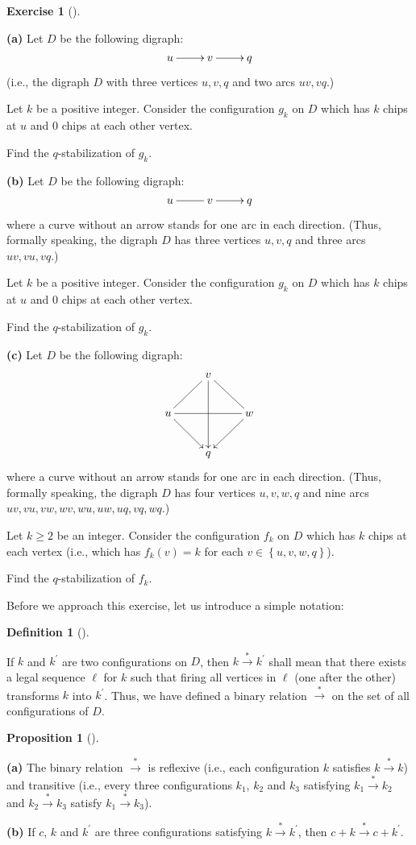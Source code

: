\documentclass[numbers=enddot,12pt,final,onecolumn,notitlepage]{scrartcl}%
\makeatletter
\newcounter{exer}
\theoremstyle{definition}
\newtheorem{prop}[theo]{Proposition}
\newenvironment{proposition}[1][]
{\begin{prop}[#1]\begin{leftbar}}
{\end{leftbar}\end{prop}}
\newtheorem{defi}[theo]{Definition}
\newenvironment{definition}[1][]
{\begin{defi}[#1]\begin{leftbar}}
{\end{leftbar}\end{defi}}
\newtheorem{exmp}[exer]{Exercise}
\newenvironment{exercise}[1][]
{\begin{exmp}[#1]\begin{leftbar}}
{\end{leftbar}\end{exmp}}
\newcommand{\set}[1]{\left\{ #1 \right\}}
\newcommand{\tup}[1]{\left( #1 \right)}
\newcommand{\are}{\ar@{-}}
\makeatother
\begin{document}
\Needspace{15cm}
\begin{exercise} \label{exe.chip.examples}
\textbf{(a)} Let $D$ be the following digraph:
\[
\xymatrix{
 u \ar[r] & v \ar[r] & q
}
\]
(i.e., the digraph $D$ with three vertices
$u, v, q$ and two arcs $uv, vq$.)

Let $k$ be a positive integer.
Consider the configuration $g_k$ on $D$ which has $k$ chips at $u$
and $0$ chips at each other vertex.

Find the $q$-stabilization of $g_k$.

\textbf{(b)} Let $D$ be the following digraph:
\[
\xymatrix{
 u \are[r] & v \ar[r] & q
}
\]
where a curve without an arrow stands for one arc in each
direction.
(Thus, formally speaking, the digraph $D$ has three vertices
$u, v, q$ and three arcs $uv, vu, vq$.)

Let $k$ be a positive integer.
Consider the configuration $g_k$ on $D$ which has $k$ chips at $u$
and $0$ chips at each other vertex.

Find the $q$-stabilization of $g_k$.

\textbf{(c)} Let $D$ be the following digraph:
\[
\xymatrix{
 & v \are[dl] \are[dr] \ar[dd] \\
 u \are[rr] \ar[dr] & & w \ar[dl] \\
 & q
}
\]
where a curve without an arrow stands for one arc in each
direction.
(Thus, formally speaking, the digraph $D$ has four vertices
$u, v, w, q$ and nine arcs
$uv, vu, vw, wv, wu, uw, uq, vq, wq$.)

Let $k \geq 2$ be an integer.
Consider the configuration $f_k$ on $D$ which has $k$ chips at each
vertex (i.e., which has $f_k \tup{v} = k$ for each
$v \in \set{u, v, w, q}$).

Find the $q$-stabilization of $f_k$.
\end{exercise}

Before we approach this exercise, let us introduce a simple notation:

\begin{definition}
\label{def.firearrow}If $k$ and $k^{\prime}$ are two configurations on $D$,
then $k\overset{\ast}{\rightarrow}k^{\prime}$ shall mean that there exists a
legal sequence $\ell$ for $k$ such that firing all vertices in $\ell$ (one
after the other) transforms $k$ into $k^{\prime}$. Thus, we have defined a
binary relation $\overset{\ast}{\rightarrow}$ on the set of all configurations
of $D$.
\end{definition}

\begin{proposition}
\label{prop.firearrow.1}\textbf{(a)} The binary relation $\overset{\ast
}{\rightarrow}$ is reflexive (i.e., each configuration $k$ satisfies
$k\overset{\ast}{\rightarrow}k$) and transitive (i.e., every three
configurations $k_{1}$, $k_{2}$ and $k_{3}$ satisfying $k_{1}\overset{\ast
}{\rightarrow}k_{2}$ and $k_{2}\overset{\ast}{\rightarrow}k_{3}$ satisfy
$k_{1}\overset{\ast}{\rightarrow}k_{3}$).

\textbf{(b)} If $c$, $k$ and $k^{\prime}$ are three configurations satisfying
$k\overset{\ast}{\rightarrow}k^{\prime}$, then $c+k\overset{\ast}{\rightarrow
}c+k^{\prime}$.
\end{proposition}
\end{document}
